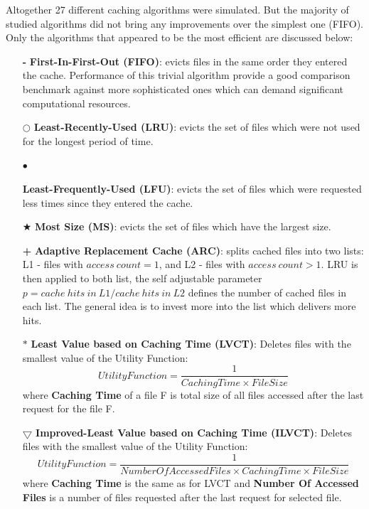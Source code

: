 \documentclass[english]{ddny}
\begin{document}
Altogether 27 different caching algorithms were simulated. But the majority of studied algorithms did not bring any improvements over the simplest one (FIFO). Only the algorithms that appeared to be the most efficient are discussed below: 
\begin{itemize}
\item[\textbf{-}]\textbf{First-In-First-Out (FIFO)}: evicts files in the same order they entered the cache. Performance of this trivial algorithm  provide a good comparison benchmark against  more sophisticated ones  which can demand  significant computational resources.
\item[$\bigcirc $]\textbf{Least-Recently-Used (LRU)}: evicts the set of files which were not used for the longest period of time.
\item[\begin{Large}$\bullet $\end{Large}]\textbf{Least-Frequently-Used (LFU)}: evicts the set of files which were requested less times since they entered the cache.
\item[$\bigstar $] \textbf{Most Size (MS)}: evicts the set of files which have the largest size.
\item[\textbf{+}]\textbf{Adaptive Replacement Cache (ARC)}\cite{ARC}: splits cached files into two lists: L1 - files with $access~count=1$, and L2 - files with $access~count>1$. LRU is then applied to both list, the self adjustable parameter $p = cache~hits~in~L1 / cache~hits~in~L2$ defines the number of cached files in each list. The general idea is to invest more into the list which delivers more hits.
\item[$\ast $]{\textbf{Least Value based on Caching Time (LVCT)}}\cite{Cache_in_Grid}: Deletes files with the smallest value of the  Utility Function:
\begin{equation}
Utility Function = \frac{1}{Caching Time \times File Size}
\end{equation}   
where \textbf{Caching Time} of a file F is total size of all files accessed after the last request for the file F.
\item[$\bigtriangledown $]{\textbf{Improved-Least Value based on Caching Time (ILVCT)}}\cite{ILVCT}: Deletes files with the smallest value of the  Utility Function:
\begin{equation}
Utility Function = \frac{1}{Number Of Accessed Files \times Caching Time \times File Size}
\end{equation}   
where \textbf{Caching Time} is the same as for LVCT and \textbf{Number Of Accessed Files}  is a number of files requested after the last request for selected file. 
\end{itemize}
\end{document}
